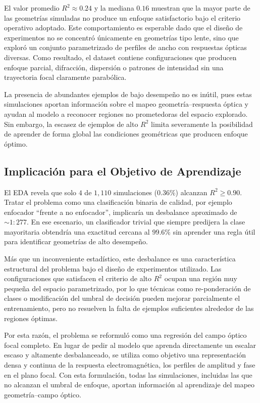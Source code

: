 El valor promedio $R^2 \approx 0.24$ y la mediana $0.16$ muestran que la mayor parte de las geometrías simuladas no produce un enfoque satisfactorio bajo el criterio operativo adoptado. Este comportamiento es esperable dado que el diseño de experimentos no se concentró únicamente en geometrías tipo lente, sino que exploró un conjunto parametrizado de perfiles de ancho con respuestas ópticas diversas. Como resultado, el dataset contiene configuraciones que producen enfoque parcial, difracción, dispersión o patrones de intensidad sin una trayectoria focal claramente parabólica.

La presencia de abundantes ejemplos de bajo desempeño no es inútil, pues estas simulaciones aportan información sobre el mapeo geometría--respuesta óptica y ayudan al modelo a reconocer regiones no prometedoras del espacio explorado. Sin embargo, la escasez de ejemplos de alto $R^2$ limita severamente la posibilidad de aprender de forma global las condiciones geométricas que producen enfoque óptimo.

\subsection{Implicación para el Objetivo de Aprendizaje}\label{subsec:implicacion}

El EDA revela que solo $4$ de $1{,}110$ simulaciones ($0.36\%$) alcanzan $R^2 \geq 0.90$. Tratar el problema como una clasificación binaria de calidad, por ejemplo enfocador ``frente a no enfocador'', implicaría un desbalance aproximado de ${\sim}1{:}277$. En ese escenario, un clasificador trivial que siempre predijera la clase mayoritaria obtendría una exactitud cercana al $99.6\%$ sin aprender una regla útil para identificar geometrías de alto desempeño.

Más que un inconveniente estadístico, este desbalance es una característica estructural del problema bajo el diseño de experimentos utilizado. Las configuraciones que satisfacen el criterio de alto $R^2$ ocupan una región muy pequeña del espacio parametrizado, por lo que técnicas como re-ponderación de clases o modificación del umbral de decisión pueden mejorar parcialmente el entrenamiento, pero no resuelven la falta de ejemplos suficientes alrededor de las regiones óptimas.

Por esta razón, el problema se reformuló como una regresión del campo óptico focal completo. En lugar de pedir al modelo que aprenda directamente un escalar escaso y altamente desbalanceado, se utiliza como objetivo una representación densa y continua de la respuesta electromagnética, los perfiles de amplitud y fase en el plano focal. Con esta formulación, todas las simulaciones, incluidas las que no alcanzan el umbral de enfoque, aportan información al aprendizaje del mapeo geometría--campo óptico.

